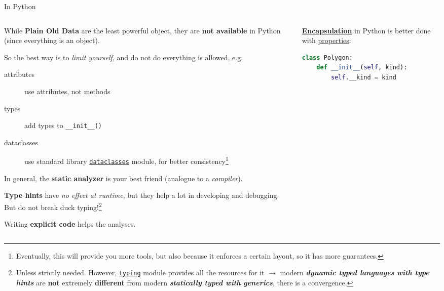 \documentclass[9pt]{beamer}
\begin{document}
\begin{frame}[fragile]{In Python}
    \vspace*{30pt}
    \begin{columns}
        \begin{column}{0.5\textwidth}
            While \textbf{Plain Old Data} are the least powerful object, they
            are \textbf{not available} in Python (since everything is an
            object).
            
            So the best way is to \alert{\textit{limit yourself}}, and do not
            do everything is allowed, e.g.\
            \begin{description}
                \item[attributes] use attributes, not methods
                \item[types] add types to \texttt{\_\_init\_\_()}
                \item[dataclasses] use standard library
                  \href{https://docs.python.org/3/library/dataclasses.html}{\texttt{dataclasses}}
                  module, for better consistency\footnote{
                      Eventually, this will provide you more tools, but also
                      because it enforces a certain layout, so it has more
                      guarantees.
                  }
            \end{description}
            \vspace*{10pt}

            In general, the \textbf{static analyzer} is your best friend
            (analogue to a \textit{compiler}).

            \textbf{Type hints} have \textit{no effect at runtime}, but they
            help a lot in developing and debugging.
            But do not break duck typing!\footnote{
                Unless strictly needed.
                However,
                \href{https://docs.python.org/3/library/typing.html}{\texttt{typing}}
                module provides all the resources for it $\to$ modern
                \textbf{\textit{dynamic typed languages with type hints}} are
                \alert{\textbf{not}} extremely \alert{\textbf{different}} from
                modern \textbf{\textit{statically typed with generics}}, there
                is a convergence.
            }\newline

            Writing \textbf{explicit code} helps the analyses.
        \end{column}
        \begin{column}{0.5\textwidth}
            \href{https://en.wikipedia.org/wiki/Encapsulation_(computer_programming)}{\textbf{Encapsulation}}
            in Python is better done with
            \href{https://docs.python.org/3/library/functions.html#property}{properties}:
            \begin{lstlisting}[language=Python,style=mystyle]
class Polygon:
    def __init__(self, kind):
        self.__kind = kind


\end{lstlisting}
\end{column}
\end{columns}
\end{frame}
\end{document}

